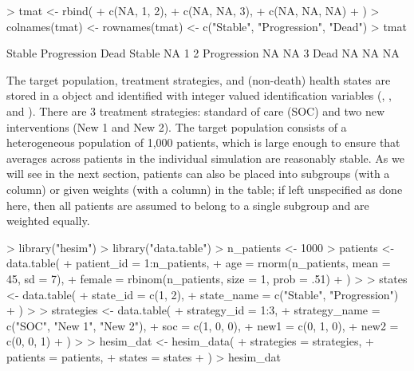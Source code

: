 \documentclass[article, nojss]{jss}\usepackage[]{graphicx}\usepackage[]{color}
\begin{document}
\begin{Schunk}
\begin{Sinput}
> tmat <- rbind(
+   c(NA, 1, 2),
+   c(NA, NA, 3),
+   c(NA, NA, NA)
+ )
> colnames(tmat) <- rownames(tmat) <- c("Stable", "Progression", "Dead")
> tmat
\end{Sinput}
\begin{Soutput}
            Stable Progression Dead
Stable          NA           1    2
Progression     NA          NA    3
Dead            NA          NA   NA
\end{Soutput}
\end{Schunk}

The target population, treatment strategies, and (non-death) health states are stored in a  object and identified with integer valued identification variables (, , and ). There are 3 treatment strategies: standard of care (SOC) and two new interventions (New 1 and New 2). The target population consists of a heterogeneous population of 1,000 patients, which is large enough to ensure that averages across patients in the individual simulation are reasonably stable. As we will see in the next section, patients can also be placed into subgroups (with a  column) or given weights (with a  column) in the  table; if left unspecified as done here, then all patients are assumed to belong to a single subgroup and are weighted equally.

\begin{Schunk}
\begin{Sinput}
> library("hesim")
> library("data.table")
> n_patients <- 1000
> patients <- data.table(
+   patient_id = 1:n_patients,
+   age = rnorm(n_patients, mean = 45, sd = 7),
+   female = rbinom(n_patients, size = 1, prob = .51)
+ )
> 
> states <- data.table(
+   state_id = c(1, 2),
+   state_name = c("Stable", "Progression") 
+ )
> 
> strategies <- data.table(
+   strategy_id = 1:3,
+   strategy_name = c("SOC", "New 1", "New 2"),
+   soc = c(1, 0, 0),
+   new1 = c(0, 1, 0),
+   new2 = c(0, 0, 1)
+ )
> 
> hesim_dat <- hesim_data(
+   strategies = strategies,
+   patients = patients,
+   states = states
+ )
> hesim_dat
\end{Sinput}
\end{Schunk}
\end{document}
